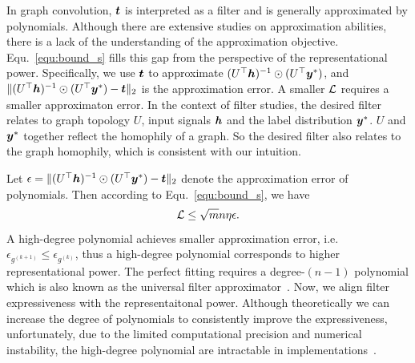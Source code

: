 \documentclass{article} %
\def\valpha{{\bm\alpha}}
\def\vlambda{{\bm\lambda}}
\newtheorem{proposition}{\textbf{Proposition}} %
\begin{document}
In graph convolution, ${\bm{t}}$ is interpreted as a filter and is generally approximated by polynomials.
Although there are extensive studies on approximation abilities, there is a lack of the understanding of the approximation objective.
Equ.~\ref{equ:bound_s} fills this gap from the perspective of the representational power.
Specifically, we use ${\bm{t}}$ to approximate $(U^{\top}{\bm{h}})^{-1}\odot(U^{\top}{\bm{y}}^*)$, and $\|(U^{\top}{\bm{h}})^{-1}\odot(U^{\top}{\bm{y}}^*)-{\bm{t}}\|_2$ is the approximation error.
A smaller ${\mathcal{L}}$ requires a smaller approximaton error.
In the context of filter studies, the desired filter relates to graph topology $U$, input signals ${\bm{h}}$ and the label distribution ${\bm{y}}^*$.
$U$ and ${\bm{y}}^*$ together reflect the homophily of a graph.
So the desired filter also relates to the graph homophily, which is consistent with our intuition.

Let $\epsilon=\|(U^{\top}{\bm{h}})^{-1}\odot(U^{\top}{\bm{y}}^*)-{\bm{t}}\|_2$ denote the approximation error of polynomials.
Then according to Equ.~\ref{equ:bound_s}, we have
\begin{equation}
	\label{equ:bound_poly}
	\begin{aligned}
		{\mathcal{L}}\leq\sqrt{m}n\eta\epsilon.
	\end{aligned}
\end{equation}
A high-degree polynomial achieves smaller approximation error, i.e. $\epsilon_{g^{(k+1)}}\leq\epsilon_{g^{(k)}}$, thus a high-degree polynomial corresponds to higher representational power.
The perfect fitting requires a degree-$(n-1)$ polynomial which is also known as the universal filter approximator~\citep{he2021bernnet,yang2022spectrum,JacobiConv,bo2022specformer}.
Now, we align filter expressiveness with the representaitonal power.
Although theoretically we can increase the degree of polynomials to consistently improve the expressiveness, unfortunately, due to the limited computational precision and numerical instability, the high-degree polynomial are intractable in implementations~\citep{yang2022spectrum}.
\end{document}
